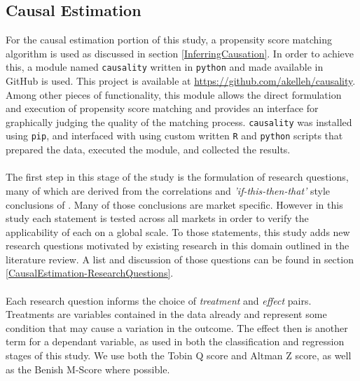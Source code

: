 {\subsection{Causal Estimation}
{For the causal estimation portion of this study, a propensity score matching algorithm is used as discussed in section \ref{InferringCausation}. In order to achieve this, a module named {\texttt{causality}} written in {\texttt{python}} and made available in GitHub is used. This project is available at \url{https://github.com/akelleh/causality}. Among other pieces of functionality, this module allows the direct formulation and execution of propensity score matching and provides an interface for graphically judging the quality of the matching process. {\texttt{causality}} was installed using {\texttt{pip}}, and interfaced with using custom written {\texttt{R}} and {\texttt{python}} scripts that prepared the data, executed the module, and collected the results.   \\\\
The first step in this stage of the study is the formulation of research questions, many of which are derived from the correlations and {\it 'if-this-then-that'} style conclusions of \cite{moldovan2015learning}. Many of those conclusions are market specific. However in this study each statement is tested across all markets in order to verify the applicability of each on a global scale. To those statements, this study adds new research questions motivated by existing research in this domain outlined in the literature review. A list and discussion of those questions can be found in section \ref{CausalEstimation-ResearchQuestions}.\\\\
Each research question informs the choice of {\it treatment} and {\it effect} pairs. Treatments are variables contained in the data already and represent some condition that may cause a variation in the outcome. The effect then is another term for a dependant variable, as used in both the classification and regression stages of this study. We use both the Tobin Q score and Altman Z score, as well as the Benish M-Score where possible.}
}
